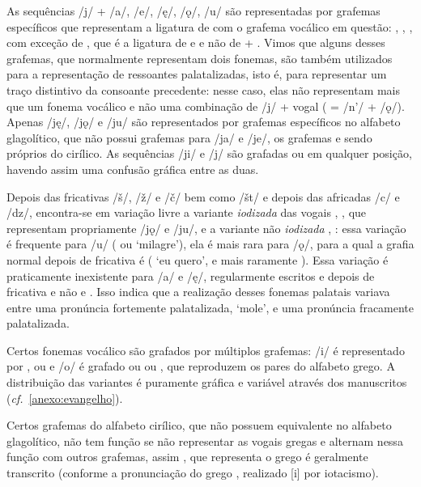 As sequências /j/ + /a/, /e/, /ę/, /ǫ/, /u/ são representadas por grafemas
específicos que representam a ligatura de  com o grafema
vocálico em questão: , ,
,  com exceção de
, que é a ligatura de  e
 e não de  + .
Vimos que alguns desses grafemas, que normalmente representam dois fonemas, são
também utilizados para a representação de ressoantes palatalizadas, isto é, para
representar um traço distintivo da consoante precedente: nesse caso, elas não
representam mais que um fonema vocálico e não uma combinação de /j/ + vogal
( = /n'/ + /ǫ/).
Apenas /ję/, /jǫ/ e /ju/ são representados por grafemas específicos no alfabeto
glagolítico, que não possui grafemas para /ja/ e /je/, os grafemas
 e  sendo próprios do cirílico.
As sequências /ji/ e /j\jeri{}/ são grafadas  ou
 em qualquer posição, havendo assim uma confusão gráfica
entre as duas.

Depois das fricativas /š/, /ž/ e /č/ bem como /št/ e depois das africadas /c/ e
/dz/, encontra-se em variação livre a variante \emph{iodizada} das vogais
, , que representam propriamente
/jǫ/ e /ju/, e a variante não \emph{iodizada} ,
: essa variação é frequente para /u/ ( ou
 `milagre'), ela é mais rara para /ǫ/, para a
qual a grafia normal depois de fricativa é 
( `eu quero', e mais raramente
).
Essa variação é praticamente inexistente para /a/ e /ę/, regularmente escritos
 e  depois de fricativa e não  e
.
Isso indica que a realização desses fonemas palatais variava entre uma pronúncia
fortemente palatalizada, `mole', e uma pronúncia fracamente palatalizada.

Certos fonemas vocálico são grafados por múltiplos grafemas: /i/ é representado
por ,  ou  e /o/ é grafado ou 
ou , que reproduzem os pares do alfabeto grego.
A distribuição das variantes é puramente gráfica e variável através dos
manuscritos (\emph{cf.}~\autoref{anexo:evangelho}).

Certos grafemas do alfabeto cirílico, que não possuem equivalente no alfabeto
glagolítico, não tem função se não representar as vogais gregas e alternam nessa
função com outros grafemas, assim , que representa o 
grego é geralmente transcrito  (conforme a pronunciação do grego
, realizado [i] por iotacismo).

